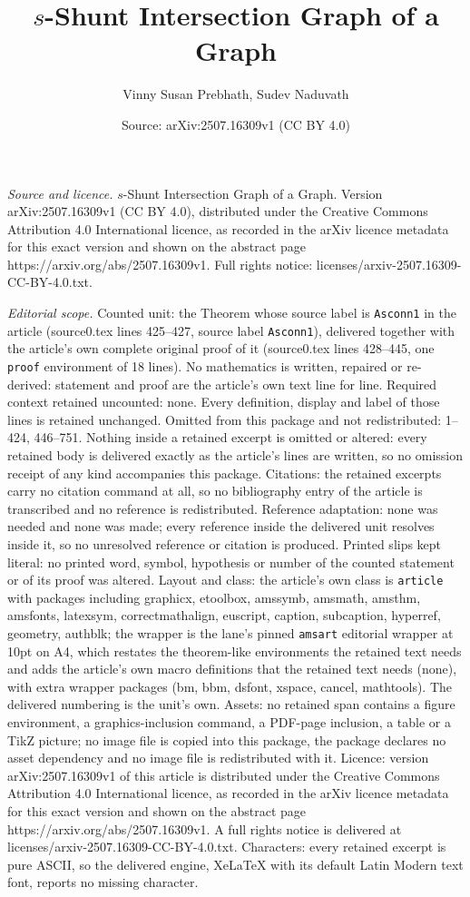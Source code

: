 \documentclass[10pt,a4paper]{amsart}
\title[$s$-Shunt Intersection Graph of a Graph]{$s$-Shunt Intersection Graph of a Graph}
\author{Vinny Susan Prebhath, Sudev Naduvath}
\date{Source: arXiv:2507.16309v1 (CC BY 4.0)}
\begin{document}
\maketitle

\noindent\emph{Source and licence.} $s$-Shunt Intersection Graph of a Graph. Version arXiv:2507.16309v1 (CC BY 4.0), distributed under the Creative Commons Attribution 4.0 International licence, as recorded in the arXiv licence metadata for this exact version and shown on the abstract page https://arxiv.org/abs/2507.16309v1. Full rights notice: licenses/arxiv-2507.16309-CC-BY-4.0.txt.\par\smallskip

\noindent\textit{Editorial scope.} Counted unit: the Theorem whose source label is \texttt{Asconn1} in the article (source0.tex lines 425--427, source label \texttt{Asconn1}), delivered together with the article's own complete original proof of it (source0.tex lines 428--445, one \texttt{proof} environment of 18 lines). No mathematics is written, repaired or re-derived: statement and proof are the article's own text line for line. Required context retained uncounted: none. Every definition, display and label of those lines is retained unchanged. Omitted from this package and not redistributed: 1--424, 446--751. Nothing inside a retained excerpt is omitted or altered: every retained body is delivered exactly as the article's lines are written, so no omission receipt of any kind accompanies this package. Citations: the retained excerpts carry no citation command at all, so no bibliography entry of the article is transcribed and no reference is redistributed. Reference adaptation: none was needed and none was made; every reference inside the delivered unit resolves inside it, so no unresolved reference or citation is produced. Printed slips kept literal: no printed word, symbol, hypothesis or number of the counted statement or of its proof was altered. Layout and class: the article's own class is \texttt{article} with packages including graphicx, etoolbox, amssymb, amsmath, amsthm, amsfonts, latexsym, correctmathalign, euscript, caption, subcaption, hyperref, geometry, authblk; the wrapper is the lane's pinned \texttt{amsart} editorial wrapper at 10pt on A4, which restates the theorem-like environments the retained text needs and adds the article's own macro definitions that the retained text needs (none), with extra wrapper packages (bm, bbm, dsfont, xspace, cancel, mathtools). The delivered numbering is the unit's own. Assets: no retained span contains a figure environment, a graphics-inclusion command, a PDF-page inclusion, a table or a TikZ picture; no image file is copied into this package, the package declares no asset dependency and no image file is redistributed with it. Licence: version arXiv:2507.16309v1 of this article is distributed under the Creative Commons Attribution 4.0 International licence, as recorded in the arXiv licence metadata for this exact version and shown on the abstract page https://arxiv.org/abs/2507.16309v1. A full rights notice is delivered at licenses/arxiv-2507.16309-CC-BY-4.0.txt. Characters: every retained excerpt is pure ASCII, so the delivered engine, XeLaTeX with its default Latin Modern text font, reports no missing character.
\end{document}
